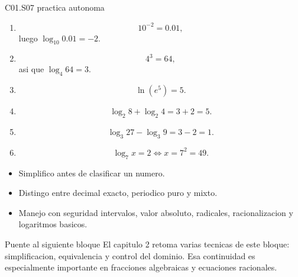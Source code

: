 \begin{fullsolution}{C01.S07 practica autonoma}
\begin{enumerate}[label=\textbf{PX-C01.S07-\arabic*:}, leftmargin=*]
  \item
  \[
  10^{-2}=0.01,
  \]
  luego \(\log_{10}0.01=-2\).
  \item
  \[
  4^3=64,
  \]
  asi que \(\log_4 64=3\).
  \item
  \[
  \ln(e^5)=5.
  \]
  \item
  \[
  \log_2 8+\log_2 4=3+2=5.
  \]
  \item
  \[
  \log_3 27-\log_3 9=3-2=1.
  \]
  \item
  \[
  \log_7 x=2 \Longleftrightarrow x=7^2=49.
  \]
\end{enumerate}
\end{fullsolution}

\begin{selfcheck}
\begin{itemize}
  \item Simplifico antes de clasificar un numero.
  \item Distingo entre decimal exacto, periodico puro y mixto.
  \item Manejo con seguridad intervalos, valor absoluto, radicales, racionalizacion y
  logaritmos basicos.
\end{itemize}
\end{selfcheck}

\begin{extension}{Puente al siguiente bloque}
El capitulo 2 retoma varias tecnicas de este bloque: simplificacion, equivalencia y control del
dominio. Esa continuidad es especialmente importante en fracciones algebraicas y ecuaciones
racionales.
\end{extension}
